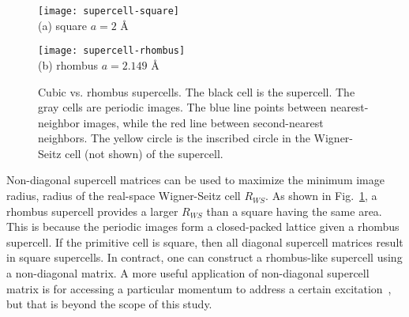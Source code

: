 \begin{figure}[h]
\centering
\begin{minipage}{0.49\textwidth}
\centering
\texttt{[image: supercell-square]}\\
(a) square $a=2$ \AA
\end{minipage}
\begin{minipage}{0.49\textwidth}
\centering
\texttt{[image: supercell-rhombus]}\\
(b) rhombus $a=2.149$ \AA
\end{minipage}
\caption{Cubic vs. rhombus supercells. The black cell is the supercell. The gray cells are periodic images. The blue line points between nearest-neighbor images, while the red line between second-nearest neighbors. The yellow circle is the inscribed circle in the Wigner-Seitz cell (not shown) of the supercell.}
\label{fig:hsolid-square-vs-rhombus}
\end{figure}

Non-diagonal supercell matrices can be used to maximize the minimum image radius, radius of the real-space Wigner-Seitz cell $R_{WS}$.
As shown in Fig.~\ref{fig:hsolid-square-vs-rhombus}, a rhombus supercell provides a larger $R_{WS}$ than a square having the same area.
This is because the periodic images form a closed-packed lattice given a rhombus supercell.
If the primitive cell is square, then all diagonal supercell matrices result in square supercells. In contract, one can construct a rhombus-like supercell using a non-diagonal matrix.
A more useful application of non-diagonal supercell matrix is for accessing a particular momentum to address a certain excitation~\cite{Lloyd-Williams2015}, but that is beyond the scope of this study.

